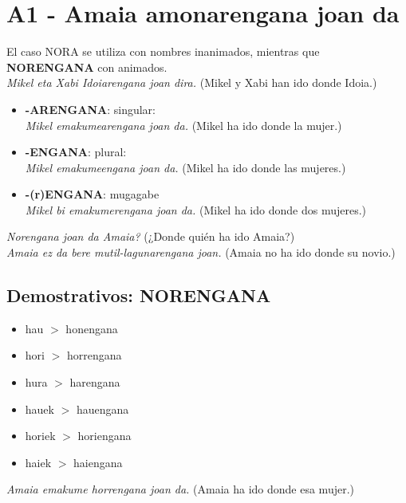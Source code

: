 \documentclass[11pt, a4paper]{article}
\begin{document}
\section{A1 - Amaia amonarengana joan da}
\noindent El caso NORA se utiliza con nombres inanimados, mientras que \textbf{NORENGANA} con animados.\\
\indent \textit{Mikel eta Xabi Idoiarengana joan dira.} (Mikel y Xabi han ido donde Idoia.)\\
\begin{itemize}
\item \textbf{-ARENGANA}: singular:\\ \textit{Mikel emakumearengana joan da.} (Mikel ha ido donde la mujer.)
\item \textbf{-ENGANA}: plural:\\
\textit{Mikel emakumeengana joan da.}
(Mikel ha ido donde las mujeres.)
\item \textbf{-(r)ENGANA}: mugagabe\\
\textit{Mikel bi emakumerengana joan da.} (Mikel ha ido donde dos mujeres.)
\end{itemize}

\indent \textit{Norengana joan da Amaia?} (¿Donde quién ha ido Amaia?)\\
\indent \textit{Amaia ez da bere mutil-lagunarengana joan.} (Amaia no ha ido donde su novio.)

\subsection{Demostrativos: NORENGANA}
\begin{multicols}{2}
\begin{itemize}
\item hau $>$ honengana
\item hori $>$ horrengana
\item hura $>$ harengana
\item hauek $>$ hauengana
\item horiek $>$ horiengana
\item haiek $>$ haiengana
\end{itemize}
\end{multicols}
\indent \textit{Amaia emakume horrengana joan da.} (Amaia ha ido donde esa mujer.)
\end{document}
